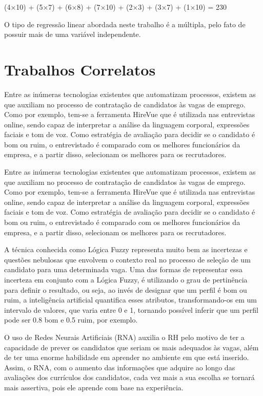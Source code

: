 \documentclass[conference]{IEEEtran}
\begin{document}
(4×10) + (5×7) + (6×8) + (7×10) + (2×3) + (3×7) + (1×10) = 230

O tipo de regressão linear abordada neste trabalho é a múltipla, pelo fato de possuir mais de uma variável independente. 

\section*{Trabalhos Correlatos}
Entre as inúmeras tecnologias existentes que automatizam processos, existem as que auxiliam no processo de contratação de candidatos às vagas de emprego. Como por exemplo, tem-se a ferramenta HireVue que é utilizada nas entrevistas online, sendo capaz de interpretar a análise da linguagem corporal, expressões faciais e tom de voz. Como estratégia de avaliação para decidir se o candidato é bom ou ruim, o entrevistado é comparado com os melhores funcionários da empresa, e a partir disso, selecionam os melhores para os recrutadores.

Entre as inúmeras tecnologias existentes que automatizam processos, existem as que auxiliam no processo de contratação de candidatos às vagas de emprego. Como por exemplo, tem-se a ferramenta HireVue que é utilizada nas entrevistas online, sendo capaz de interpretar a análise da linguagem corporal, expressões faciais e tom de voz. Como estratégia de avaliação para decidir se o candidato é bom ou ruim, o entrevistado é comparado com os melhores funcionários da empresa, e a partir disso, selecionam os melhores para os recrutadores.

A técnica conhecida como Lógica Fuzzy representa muito bem as incertezas e questões nebulosas que envolvem o contexto real no processo de seleção de um candidato para uma determinada vaga. Uma das formas de representar essa incerteza em conjunto com a Lógica Fuzzy, é utilizando o grau de pertinência para definir o resultado, ou seja, ao invés de designar que um perfil é bom ou ruim, a inteligência artificial quantifica esses atributos, transformando-os em um intervalo de valores, que varia entre 0 e 1, tornando possível inferir que um perfil pode ser 0.8 bom e 0.5 ruim, por exemplo.

O uso de Redes Neurais Artificiais (RNA) auxilia o RH pelo motivo de ter a capacidade de prever os candidatos que seriam os mais adequados às vagas, além de ter uma enorme habilidade em aprender no ambiente em que está inserido. Assim, o RNA, com o aumento das informações que adquire ao longo das avaliações dos currículos dos candidatos, cada vez mais a sua escolha se tornará mais assertiva, pois ele aprende com base na experiência.
\end{document}
